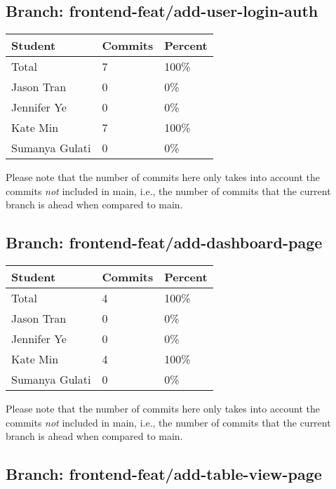 \documentclass{article}
\begin{document}
\subsection{Branch: frontend-feat/add-user-login-auth}

\begin{table}[H]
\centering
\begin{tabular}{lll}
\toprule
\textbf{Student} & \textbf{Commits} & \textbf{Percent}\\
\midrule
Total & 7 & 100\% \\
Jason Tran & 0 & 0\% \\
Jennifer Ye & 0 & 0\% \\
Kate Min & 7 & 100\% \\
Sumanya Gulati & 0 & 0\% \\
\bottomrule
\end{tabular}
\end{table}

Please note that the number of commits here only takes into account the commits \emph{not}
included in main, i.e., the number of commits that the current branch is ahead when compared 
to main.

\subsection{Branch: frontend-feat/add-dashboard-page}

\begin{table}[H]
\centering
\begin{tabular}{lll}
\toprule
\textbf{Student} & \textbf{Commits} & \textbf{Percent}\\
\midrule
Total & 4 & 100\% \\
Jason Tran & 0 & 0\% \\
Jennifer Ye & 0 & 0\% \\
Kate Min & 4 & 100\% \\
Sumanya Gulati & 0 & 0\% \\
\bottomrule
\end{tabular}
\end{table}

Please note that the number of commits here only takes into account the commits \emph{not}
included in main, i.e., the number of commits that the current branch is ahead when compared 
to main.

\subsection{Branch: frontend-feat/add-table-view-page}
\end{document}
